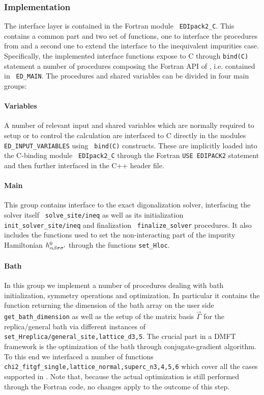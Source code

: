 \documentclass[edipack2.tex]{subfiles}
\begin{document}
\subsubsection{Implementation}\label{sSecInteropCbindingsImplementation}
The interface layer is contained in the Fortran module {\tt
  EDIpack2\_C}. This contains a common part and two set of functions,
one to interface the procedures from \NAME and a second
one to extend the interface to the inequivalent impurities case.
Specifically, the implemented interface functions expose to C through
{\tt bind(C)} statement a number of
procedures composing the Fortran API of \NAME, i.e. contained in {\tt
  ED\_MAIN}. The procedures and shared variables can be divided in four main groups:

\paragraph{{\bf Variables}}
A number of relevant input and shared variables which are normally
required to setup or to control the calculation are interfaced to C
directly in the \NAME modules {\tt ED\_INPUT\_VARIABLES} using {\tt
  bind(C)} constructs. These are implicitly loaded into the C-binding module {\tt
  EDIpack2\_C} through the Fortran {\tt USE EDIPACK2} statement and
then further interfaced in the C++ header file. 


\paragraph{{\bf Main}} This group contains interface to the exact
digonalization solver, interfacing the solver itself {\tt
  solve\_site/ineq} as well as its initialization
{\tt init\_solver\_site/ineq} and finalization {\tt
  finalize\_solver} procedures. It also includes the functions used to
set the non-interacting part of the impurity Hamiltonian
$h^0_{\alpha\beta\sigma\sigma'}$ through the functions {\tt set\_Hloc}.


\paragraph{{\bf Bath}} In this group we implement a number of
procedures dealing with bath initialization, symmetry operations and
optimization. In particular it contains the function returning the
dimension of the bath array on the user side {\tt
  get\_bath\_dimension} as well as the setup of the matrix basis
$\vec{\Gamma}$ for the replica/general bath via different instances of
{\tt set\_Hreplica/general\_{site,lattice}\_d{3,5}}. 
The crucial part in a DMFT framework is the optimization of the bath
through conjugate-gradient algorithm. To this end we interfaced a
number of functions {\tt
  chi2\_fitgf\_{single,lattice}\_{normal,superc}\_n{3,4,5,6}} which
cover all the cases supported in \NAME. Note that, because the actual
optimization is still performed through the Fortran code, no changes
apply to the outcome of this step.    
\end{document}
